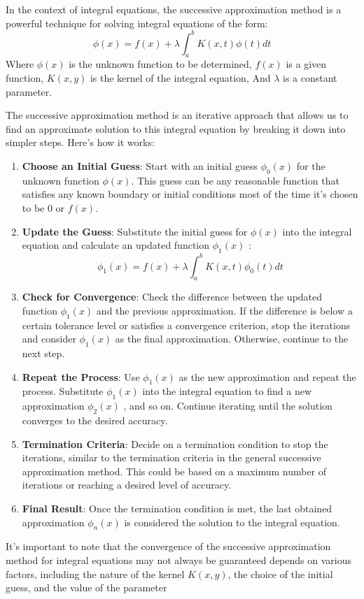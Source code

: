 In the context of integral equations, the successive approximation method is a powerful technique for solving integral equations of the form:
\[
\phi(x) = f(x) + \lambda\int_{a}^{b} K(x,t) \phi(t)dt    
\]
Where $\phi(x)$ is the unknown function to be determined,
$f(x)$  is a given function, $K(x,y)$ is the kernel of the integral equation,
And $\lambda$ is a constant parameter.

The successive approximation method is an iterative approach that allows us to find an approximate solution to this integral equation by breaking it down into simpler steps. Here's how it works:

\begin{enumerate}[itemsep=10pt]
    \item \textbf{Choose an Initial Guess}: Start with an initial guess $\phi_0(x)$ for the unknown function $\phi(x)$. This guess can be any reasonable function that satisfies any known boundary or initial conditions most of the time it's chosen to be 0 or $f(x)$.
    \item \textbf{Update the Guess}: Substitute the initial guess for $\phi(x)$ into the integral equation and calculate an updated function $\phi_1(x)$ :
    \[
       \phi_1(x) = f(x) + \lambda\int_{a}^{b} K(x,t) \phi_0(t)dt     
    \]
    \item \textbf{Check for Convergence}: Check the difference between the updated function $\phi_1(x)$ and the previous approximation. If the difference is below a certain tolerance level or satisfies a convergence criterion, stop the iterations and consider $\phi_1(x)$ as the final approximation. Otherwise, continue to the next step.
    \item \textbf{Repeat the Process}: Use $\phi_1(x)$ as the new approximation and repeat the process. Substitute $\phi_1(x)$ into the integral equation to find a new approximation $\phi_2(x)$ , and so on. Continue iterating until the solution converges to the desired accuracy.
    \item \textbf{Termination Criteria}: Decide on a termination condition to stop the iterations, similar to the termination criteria in the general successive approximation method. This could be based on a maximum number of iterations or reaching a desired level of accuracy.    
    \item \textbf{Final Result}: Once the termination condition is met, the last obtained approximation $\phi_n(x)$ is considered the solution to the integral equation.
\end{enumerate}
It's important to note that the convergence of the successive approximation method for integral equations 
may not always be guaranteed
depends on various factors, including the nature of the kernel $K(x,y)$, the choice of the initial guess, 
and the value of the parameter 

